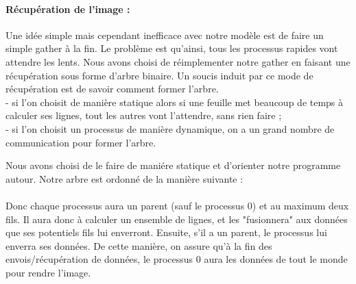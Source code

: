 \documentclass{article}
\begin{document}
\paragraph{R\'ecup\'eration de l'image : }
Une id\'ee simple mais cependant inefficace avec notre mod\`ele est de faire un simple gather \`a la fin. 
Le probl\`eme est qu'ainsi, tous les processus rapides vont attendre les lents.
Nous avons choisi de r\'eimplementer notre gather en faisant une r\'ecup\'eration sous forme d'arbre binaire.
Un soucis induit par ce mode de r\'ecup\'eration est de savoir comment former l'arbre. \\
 - si l'on choisit de mani\`ere statique alors si une feuille met beaucoup de temps \`a calculer ses lignes, tout les autres vont l'attendre, sans rien faire ; \\
 - si l'on choisit un processus de mani\`ere dynamique, on a un grand nombre de communication pour former l'arbre.

Nous avons choisi de le faire de mani\'ere statique et d'orienter notre programme autour. Notre arbre est ordonn\'e de la mani\`ere suivante :


\paragraph{}
Donc chaque processus aura un parent (sauf le processus 0) et au maximum deux fils.
Il aura donc à calculer un ensemble de lignes, et les "fusionnera" aux donn\'ees que ses potentiels fils lui enverront. 
Ensuite, s'il a un parent, le processus lui enverra ses donn\'ees.
De cette mani\`ere, on assure qu'\`a la fin des envois/r\'ecup\'eration de donn\'ees, le processus 0 aura les donn\'ees de tout le monde pour rendre l'image.
\end{document}
